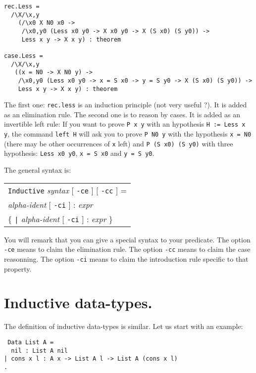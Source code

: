 \begin{verbatim}
rec.Less =
  /\X/\x,y
    (/\x0 X N0 x0 ->
     /\x0,y0 (Less x0 y0 -> X x0 y0 -> X (S x0) (S y0)) ->
     Less x y -> X x y) : theorem

case.Less =
  /\X/\x,y
   ((x = N0 -> X N0 y) ->
    /\x0,y0 (Less x0 y0 -> x = S x0 -> y = S y0 -> X (S x0) (S y0)) ->
    Less x y -> X x y) : theorem
\end{verbatim}

The first one: \verb#rec.less# is an induction principle (not very
useful ?). It is added as an elimination rule. The second one is to
reason by cases. It is added as an invertible left rule: 
If you want to prove \verb#P x y# with an hypothesis
\verb#H := Less x y#, the command \verb#left H# will ask you to prove
\verb#P N0 y# with the hypothesis \verb#x = N0# (there may be other
occurrences of \verb#x# left) and  \verb#P (S x0) (S y0)# with three
hypothesis: \verb#Less x0 y0#, \verb#x = S x0# and \verb#y = S y0#.

The general syntax is:

\begin{center}
\begin{tabular}{l}
\verb#Inductive# {\it syntax} $[$ \verb#-ce# $]$ $[$ \verb#-cc# $]$ = \\
\hspace{1cm} {\it alpha-ident} $[$ \verb#-ci# $]$ : {\it expr} \\
\hspace{1cm} $\{$ \verb#|#  {\it alpha-ident}  $[$ \verb#-ci# $]$ : {\it expr} $\}$
\end{tabular}
\end{center}

You will remark that you can give a special syntax to your predicate.
The option \verb#-ce# means to claim the elimination rule.
The option \verb#-cc# means to claim the case reasonning.
The option \verb#-ci# means to claim the introduction rule specific to
that property.

\section{Inductive data-types.}

The definition of inductive data-types is similar. Let us start with
an example:

\begin{verbatim}
 Data List A =
  nil : List A nil
| cons x l : A x -> List A l -> List A (cons x l)
.
\end{verbatim}



